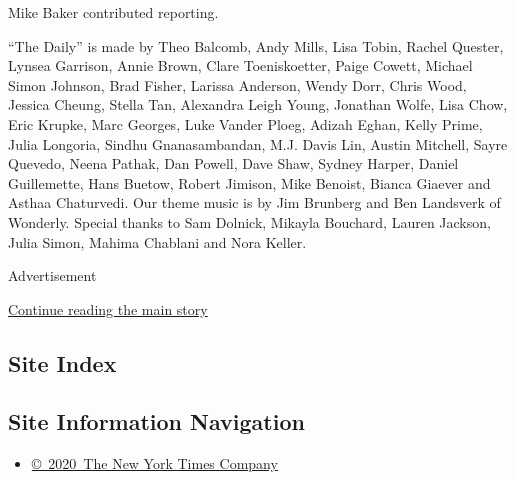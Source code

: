 Mike Baker contributed reporting.

``The Daily'' is made by Theo Balcomb, Andy Mills, Lisa Tobin, Rachel
Quester, Lynsea Garrison, Annie Brown, Clare Toeniskoetter, Paige
Cowett, Michael Simon Johnson, Brad Fisher, Larissa Anderson, Wendy
Dorr, Chris Wood, Jessica Cheung, Stella Tan, Alexandra Leigh Young,
Jonathan Wolfe, Lisa Chow, Eric Krupke, Marc Georges, Luke Vander Ploeg,
Adizah Eghan, Kelly Prime, Julia Longoria, Sindhu Gnanasambandan, M.J.
Davis Lin, Austin Mitchell, Sayre Quevedo, Neena Pathak, Dan Powell,
Dave Shaw, Sydney Harper, Daniel Guillemette, Hans Buetow, Robert
Jimison, Mike Benoist, Bianca Giaever and Asthaa Chaturvedi. Our theme
music is by Jim Brunberg and Ben Landsverk of Wonderly. Special thanks
to Sam Dolnick, Mikayla Bouchard, Lauren Jackson, Julia Simon, Mahima
Chablani and Nora Keller.

Advertisement

\protect\hyperlink{after-bottom}{Continue reading the main story}

\hypertarget{site-index}{%
\subsection{Site Index}\label{site-index}}

\hypertarget{site-information-navigation}{%
\subsection{Site Information
Navigation}\label{site-information-navigation}}

\begin{itemize}
\tightlist
\item
  \href{https://help.nytimes3xbfgragh.onion/hc/en-us/articles/115014792127-Copyright-notice}{©~2020~The
  New York Times Company}
\end{itemize}

